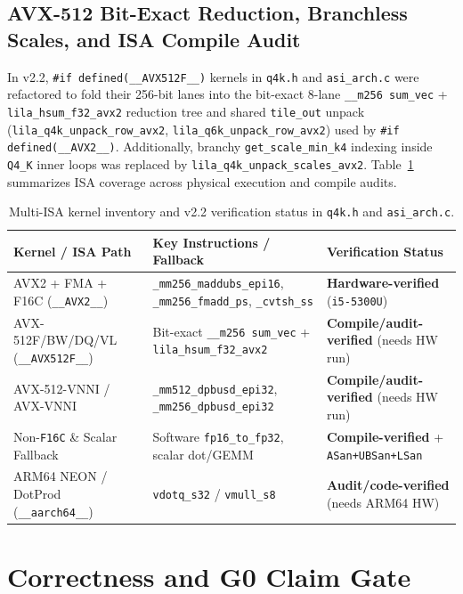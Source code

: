 \documentclass[11pt,a4paper]{article}
\begin{document}
\subsection{AVX-512 Bit-Exact Reduction, Branchless Scales, and ISA Compile Audit}
In v2.2, \texttt{\#if defined(\_\_AVX512F\_\_)} kernels in \texttt{q4k.h} and \texttt{asi\_arch.c} were refactored to fold their 256-bit lanes into the bit-exact 8-lane \texttt{\_\_m256 sum\_vec} + \texttt{lila\_hsum\_f32\_avx2} reduction tree and shared \texttt{tile\_out} unpack (\texttt{lila\_q4k\_unpack\_row\_avx2}, \texttt{lila\_q6k\_unpack\_row\_avx2}) used by \texttt{\#if defined(\_\_AVX2\_\_)}. Additionally, branchy \texttt{get\_scale\_min\_k4} indexing inside \texttt{Q4\_K} inner loops was replaced by \texttt{lila\_q4k\_unpack\_scales\_avx2}. Table~\ref{tab:isa_matrix} summarizes ISA coverage across physical execution and compile audits.

\begin{table}[h]
\centering
\small
\begin{tabular}{@{}lll@{}}
\toprule
Kernel / ISA Path & Key Instructions / Fallback & Verification Status \\
\midrule
AVX2 + FMA + F16C (\texttt{\_\_AVX2\_\_}) & \texttt{\_mm256\_maddubs\_epi16}, \texttt{\_mm256\_fmadd\_ps}, \texttt{\_cvtsh\_ss} & \textbf{Hardware-verified} (\texttt{i5-5300U}) \\
AVX-512F/BW/DQ/VL (\texttt{\_\_AVX512F\_\_}) & Bit-exact \texttt{\_\_m256 sum\_vec} + \texttt{lila\_hsum\_f32\_avx2} & \textbf{Compile/audit-verified} (needs HW run) \\
AVX-512-VNNI / AVX-VNNI & \texttt{\_mm512\_dpbusd\_epi32}, \texttt{\_mm256\_dpbusd\_epi32} & \textbf{Compile/audit-verified} (needs HW run) \\
Non-\texttt{F16C} \& Scalar Fallback & Software \texttt{fp16\_to\_fp32}, scalar dot/GEMM & \textbf{Compile-verified} + \texttt{ASan+UBSan+LSan} \\
ARM64 NEON / DotProd (\texttt{\_\_aarch64\_\_}) & \texttt{vdotq\_s32} / \texttt{vmull\_s8} & \textbf{Audit/code-verified} (needs ARM64 HW) \\
\bottomrule
\end{tabular}
\caption{Multi-ISA kernel inventory and v2.2 verification status in \texttt{q4k.h} and \texttt{asi\_arch.c}.}
\label{tab:isa_matrix}
\end{table}

\section{Correctness and G0 Claim Gate}
\end{document}
